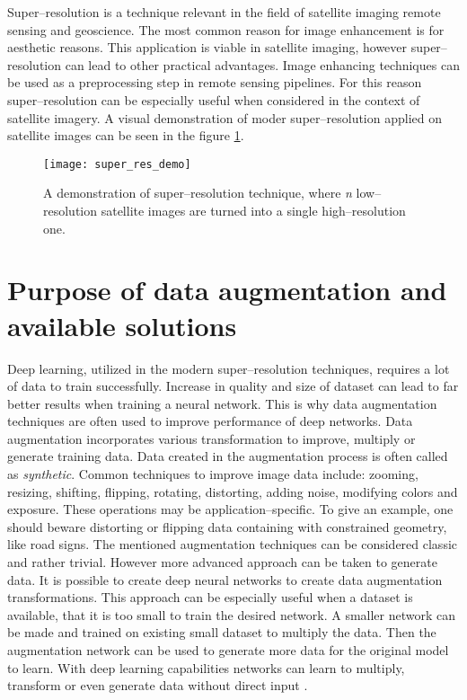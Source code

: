 Super--resolution is a technique relevant in the field of satellite imaging
remote sensing and geoscience.
The most common reason for image enhancement is for aesthetic reasons.
This application is viable in satellite imaging, however super--resolution can
lead to other practical advantages.
Image enhancing techniques can be used as a preprocessing step in remote
sensing pipelines.
For this reason super--resolution can be especially useful when considered in
the context of satellite imagery.
A visual demonstration of moder super--resolution applied on satellite images can be seen in the figure \ref{fig:super-res-demo}.
\begin{figure}
    \centering
    \texttt{[image: super\_res\_demo]}
    \caption{A demonstration of super--resolution technique, where \textit{n} low--resolution satellite images are turned into a single high--resolution one.}
    \label{fig:super-res-demo}
\end{figure}

\section{Purpose of data augmentation and available solutions}
Deep learning, utilized in the modern super--resolution techniques, requires a
lot of data to train successfully.
Increase in quality and size of dataset can lead to far better results when
training a neural network.
This is why data augmentation techniques are often used to improve performance
of deep networks.
Data augmentation incorporates various transformation to improve, multiply or
generate training data.
Data created in the augmentation process is often called as \textit{synthetic}.
Common techniques to improve image data include: zooming, resizing, shifting,
flipping, rotating, distorting, adding noise, modifying colors and exposure.
These operations may be application--specific.
To give an example, one should beware distorting or flipping data containing
with constrained geometry, like road signs.
The mentioned augmentation techniques can be considered classic and rather
trivial.
However more advanced approach can be taken to generate data.
It is possible to create deep neural networks to create data augmentation
transformations.
This approach can be especially useful when a dataset is available, that it is
too small to train the desired network.
A smaller network can be made and trained on existing small dataset to multiply
the data.
Then the augmentation network can be used to generate more data for the
original model to learn.
With deep learning capabilities networks can learn to multiply, transform or
even generate data without direct input \cite{bulat-2018-supergan}.

